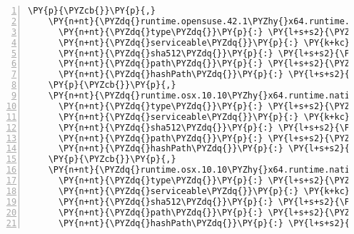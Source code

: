 \begin{Verbatim}[commandchars=\\\{\},numbers=left,firstnumber=1,stepnumber=1,numberblanklines=0]
    \PY{p}{\PYZcb{}}\PY{p}{,}
    \PY{n+nt}{\PYZdq{}runtime.opensuse.42.1\PYZhy{}x64.runtime.native.System.Security.Cryptography.OpenSsl/4.3.0\PYZdq{}}\PY{p}{:} \PY{p}{\PYZob{}}
      \PY{n+nt}{\PYZdq{}type\PYZdq{}}\PY{p}{:} \PY{l+s+s2}{\PYZdq{}package\PYZdq{}}\PY{p}{,}
      \PY{n+nt}{\PYZdq{}serviceable\PYZdq{}}\PY{p}{:} \PY{k+kc}{true}\PY{p}{,}
      \PY{n+nt}{\PYZdq{}sha512\PYZdq{}}\PY{p}{:} \PY{l+s+s2}{\PYZdq{}sha512\PYZhy{}KeLz4HClKf+nFS7p/6Fi/CqyLXh81FpiGzcmuS8DGi9lUqSnZ6Es23/gv2O+1XVGfrbNmviF7CckBpavkBoIFQ==\PYZdq{}}\PY{p}{,}
      \PY{n+nt}{\PYZdq{}path\PYZdq{}}\PY{p}{:} \PY{l+s+s2}{\PYZdq{}runtime.opensuse.42.1\PYZhy{}x64.runtime.native.system.security.cryptography.openssl/4.3.0\PYZdq{}}\PY{p}{,}
      \PY{n+nt}{\PYZdq{}hashPath\PYZdq{}}\PY{p}{:} \PY{l+s+s2}{\PYZdq{}runtime.opensuse.42.1\PYZhy{}x64.runtime.native.system.security.cryptography.openssl.4.3.0.nupkg.sha512\PYZdq{}}
    \PY{p}{\PYZcb{}}\PY{p}{,}
    \PY{n+nt}{\PYZdq{}runtime.osx.10.10\PYZhy{}x64.runtime.native.System.Security.Cryptography.Apple/4.3.0\PYZdq{}}\PY{p}{:} \PY{p}{\PYZob{}}
      \PY{n+nt}{\PYZdq{}type\PYZdq{}}\PY{p}{:} \PY{l+s+s2}{\PYZdq{}package\PYZdq{}}\PY{p}{,}
      \PY{n+nt}{\PYZdq{}serviceable\PYZdq{}}\PY{p}{:} \PY{k+kc}{true}\PY{p}{,}
      \PY{n+nt}{\PYZdq{}sha512\PYZdq{}}\PY{p}{:} \PY{l+s+s2}{\PYZdq{}sha512\PYZhy{}kVXCuMTrTlxq4XOOMAysuNwsXWpYeboGddNGpIgNSZmv1b6r/s/DPk0fYMB7Q5Qo4bY68o48jt4T4y5BVecbCQ==\PYZdq{}}\PY{p}{,}
      \PY{n+nt}{\PYZdq{}path\PYZdq{}}\PY{p}{:} \PY{l+s+s2}{\PYZdq{}runtime.osx.10.10\PYZhy{}x64.runtime.native.system.security.cryptography.apple/4.3.0\PYZdq{}}\PY{p}{,}
      \PY{n+nt}{\PYZdq{}hashPath\PYZdq{}}\PY{p}{:} \PY{l+s+s2}{\PYZdq{}runtime.osx.10.10\PYZhy{}x64.runtime.native.system.security.cryptography.apple.4.3.0.nupkg.sha512\PYZdq{}}
    \PY{p}{\PYZcb{}}\PY{p}{,}
    \PY{n+nt}{\PYZdq{}runtime.osx.10.10\PYZhy{}x64.runtime.native.System.Security.Cryptography.OpenSsl/4.3.0\PYZdq{}}\PY{p}{:} \PY{p}{\PYZob{}}
      \PY{n+nt}{\PYZdq{}type\PYZdq{}}\PY{p}{:} \PY{l+s+s2}{\PYZdq{}package\PYZdq{}}\PY{p}{,}
      \PY{n+nt}{\PYZdq{}serviceable\PYZdq{}}\PY{p}{:} \PY{k+kc}{true}\PY{p}{,}
      \PY{n+nt}{\PYZdq{}sha512\PYZdq{}}\PY{p}{:} \PY{l+s+s2}{\PYZdq{}sha512\PYZhy{}X7IdhILzr4ROXd8mI1BUCQMSHSQwelUlBjF1JyTKCjXaOGn2fB4EKBxQbCK2VjO3WaWIdlXZL3W6TiIVnrhX4g==\PYZdq{}}\PY{p}{,}
      \PY{n+nt}{\PYZdq{}path\PYZdq{}}\PY{p}{:} \PY{l+s+s2}{\PYZdq{}runtime.osx.10.10\PYZhy{}x64.runtime.native.system.security.cryptography.openssl/4.3.0\PYZdq{}}\PY{p}{,}
      \PY{n+nt}{\PYZdq{}hashPath\PYZdq{}}\PY{p}{:} \PY{l+s+s2}{\PYZdq{}runtime.osx.10.10\PYZhy{}x64.runtime.native.system.security.cryptography.openssl.4.3.0.nupkg.sha512\PYZdq{}}

\end{Verbatim}
